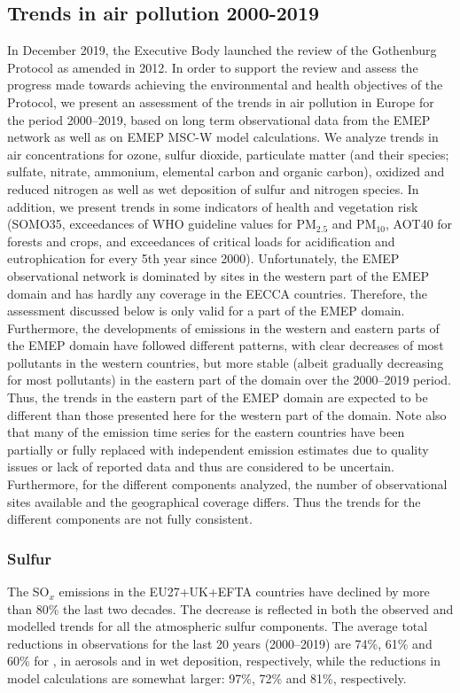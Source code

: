 \subsection*{Trends in air pollution 2000-2019}
In December 2019, the Executive Body launched the review of the Gothenburg Protocol as amended in 2012. In order to support the review and assess the progress made towards achieving the environmental and health objectives of the Protocol, we present an assessment of the trends in air pollution in Europe for the period 2000--2019, based on long term observational data from the EMEP network as well as on EMEP MSC-W model calculations.
We analyze trends in air concentrations for ozone, sulfur dioxide, particulate matter (and their species; sulfate, nitrate, ammonium, elemental carbon and organic carbon), oxidized and reduced nitrogen as well as wet deposition of sulfur and nitrogen species. In addition, we present trends in some indicators of health and vegetation risk (SOMO35, exceedances of WHO guideline values for PM$_{2.5}$ and PM$_{10}$, AOT40 for forests and crops, and exceedances of critical loads for acidification and eutrophication for every 5th year since 2000).
Unfortunately, the EMEP observational network is dominated by sites in the western part of the EMEP domain and has hardly any coverage in the EECCA countries. Therefore, the assessment discussed below is only valid for a part of the EMEP domain. Furthermore, the developments of emissions in the western and eastern parts of the EMEP domain have followed different patterns, with clear decreases of most pollutants in the western countries, but more stable (albeit gradually decreasing for most pollutants) in the eastern part of the domain over the 2000--2019 period. Thus, the trends in the eastern part of the EMEP domain are expected to be different than those presented here for the western part of the domain. Note also that many of the emission time series for the eastern countries have been partially or fully replaced with independent emission estimates due to quality issues or lack of reported data and thus are considered to be uncertain. 
Furthermore, for the different components analyzed, the number of observational sites available and the geographical coverage differs. Thus the trends for the different components are not fully consistent. 

\subsubsection*{Sulfur}
The SO$_x$ emissions in the EU27+UK+EFTA countries have declined by more than 80\% 
the last two decades. The decrease is reflected in both the observed and modelled trends for all the atmospheric sulfur components. The average total reductions in observations for the last 20 years (2000--2019) are 74\%, 61\% and 60\% for \soii, \soiv in aerosols and in wet deposition, respectively, while the reductions in model calculations are somewhat larger: 97\%, 72\% and 81\%, respectively. 

